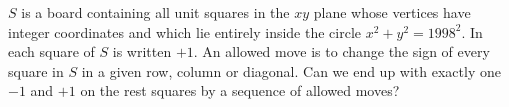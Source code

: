 $S$ is a board containing all unit squares in the $xy$ plane whose vertices have integer coordinates and which lie entirely inside the circle $x^2 + y^2 = 1998^2$. In each square of $S$ is written $+1$. An allowed move is to change the sign of every square in $S$ in a given row, column or diagonal. Can we end up with exactly one $-1$ and $+1$ on the rest squares by a sequence of allowed moves?